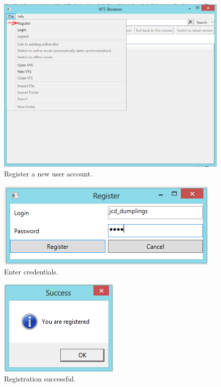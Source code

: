 \documentclass[JCDReport.tex]{subfiles}
\begin{document}
\begin{figure}[h!]
	\centering
	\includegraphics[scale=0.75]{Images/tutorial/5.png} 
	\caption{Register a new user account.}
\end{figure}

\begin{figure}[h!]
	\centering
	\includegraphics[scale=1]{Images/tutorial/6.png} 
	\caption{Enter credentials.}
\end{figure}

\begin{figure}[h!]
	\centering
	\includegraphics[scale=1]{Images/tutorial/7.png} 
	\caption{Registration successful.}
\end{figure}
\end{document}
